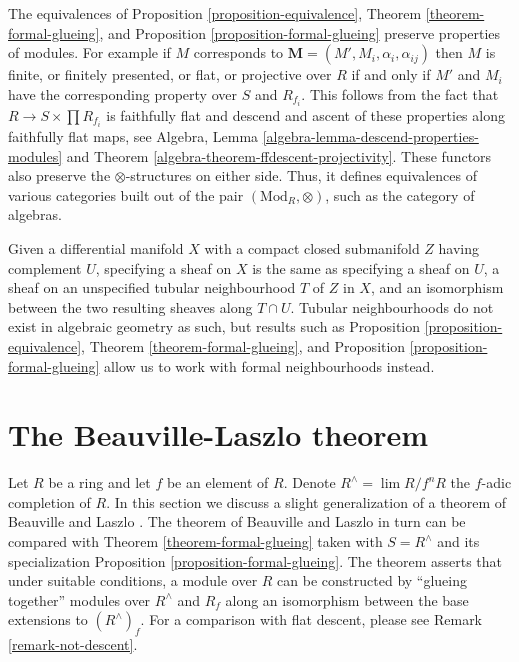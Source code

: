 \begin{remark}
\label{remark-formal-glueing-algebras}
The equivalences of
Proposition \ref{proposition-equivalence},
Theorem \ref{theorem-formal-glueing}, and
Proposition \ref{proposition-formal-glueing}
preserve properties of modules. For example if
$M$ corresponds to $\mathbf{M} = (M', M_i, \alpha_i, \alpha_{ij})$
then $M$ is finite, or finitely presented, or flat, or projective over $R$
if and only if $M'$ and $M_i$ have the corresponding property
over $S$ and $R_{f_i}$. This follows from the fact that
$R \to S \times \prod R_{f_i}$ is faithfully flat and
descend and ascent of these properties along faithfully flat maps, see
Algebra, Lemma \ref{algebra-lemma-descend-properties-modules} and
Theorem \ref{algebra-theorem-ffdescent-projectivity}.
These functors also preserve the $\otimes$-structures on either side.
Thus, it defines equivalences of various categories
built out of the pair $(\text{Mod}_R, \otimes)$, such as the category of
algebras.
\end{remark}

\begin{remark}
\label{remark-topological-analogue}
Given a differential manifold $X$ with a compact closed submanifold $Z$
having complement $U$, specifying a sheaf on $X$ is the same as specifying
a sheaf on $U$, a sheaf on an unspecified tubular neighbourhood $T$ of $Z$ in
$X$, and an isomorphism between the two resulting sheaves along $T \cap U$.
Tubular neighbourhoods do not exist in algebraic geometry as such, but
results such as
Proposition \ref{proposition-equivalence},
Theorem \ref{theorem-formal-glueing}, and
Proposition \ref{proposition-formal-glueing}
allow us to work with formal neighbourhoods instead.
\end{remark}






\section{The Beauville-Laszlo theorem}
\label{section-beauville-laszlo}

\noindent
Let $R$ be a ring and let $f$ be an element of $R$. Denote
$R^\wedge = \lim R/f^n R$ the $f$-adic completion of $R$.
In this section we discuss a slight generalization of
a theorem of Beauville and Laszlo \cite{Beauville-Laszlo}.
The theorem of Beauville and Laszlo in turn can be compared with
Theorem \ref{theorem-formal-glueing} taken with $S = R^\wedge$ and
its specialization Proposition \ref{proposition-formal-glueing}.
The theorem asserts that under suitable conditions, a module over 
$R$ can be constructed by ``glueing together'' modules over
$R^\wedge$ and $R_f$ along an isomorphism between the
base extensions to  $(R^\wedge)_f$.
For a comparison with flat descent, please see
Remark \ref{remark-not-descent}.

